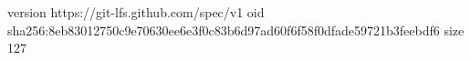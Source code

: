 version https://git-lfs.github.com/spec/v1
oid sha256:8eb83012750c9e70630ee6e3f0c83b6d97ad60f6f58f0dfade59721b3feebdf6
size 127

